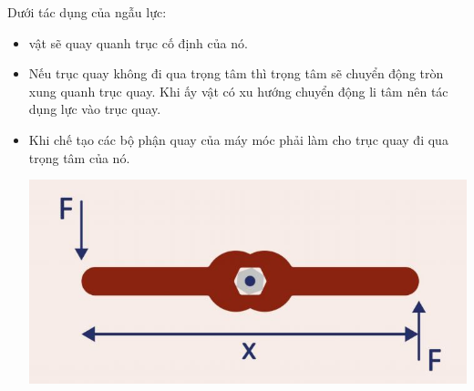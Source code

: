 Dưới tác dụng của ngẫu lực:
\begin{itemize}
	\item  vật sẽ quay quanh trục cố định của nó. 
	\item Nếu trục quay không đi qua trọng tâm thì trọng tâm sẽ chuyển động tròn xung quanh trục quay. Khi ấy vật có xu hướng chuyển động li tâm nên tác dụng lực vào trục quay.
	\item Khi chế tạo các bộ phận quay của máy móc phải làm cho trục quay đi qua trọng tâm của nó.
	\begin{center}
		\includegraphics[scale=0.4]{../figs/VN10-PH-25-L-020-1-V2-02.JPG}
	\end{center}
\end{itemize}

